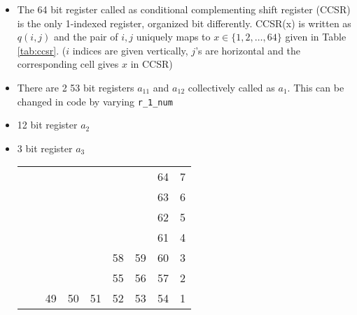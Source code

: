 \documentclass[a4paper,10pt]{article}
\begin{document}
\begin{itemize}
    \item The 64 bit register called as conditional complementing shift register (CCSR) is the only 1-indexed register, organized bit differently. CCSR(x) is written as $q{(i,j)}$ and the pair of $i,j$ uniquely maps to $x \in \{1,2,\ldots,64\}$ given in Table \ref{tab:ccsr}. ($i$ indices are given vertically, $j$'s are horizontal and the corresponding cell gives $x$ in CCSR)
    \item There are 2 53 bit registers $a_{11}$ and $a_{12}$ collectively called as $a_{1}$. This can be changed in code by varying \verb!r_1_num!
    \item 12 bit register $a_{2}$
    \item 3 bit register $a_{3}$
\begin{table}[h!]
\centering
\begin{tabular}{lllllllll}
\cline{8-8}
                               &                         &                         &                         &                         &                         & \multicolumn{1}{l|}{}   & \multicolumn{1}{l|}{64} & 7 \\ \cline{8-8}
                               &                         &                         &                         &                         &                         & \multicolumn{1}{l|}{}   & \multicolumn{1}{l|}{63} & 6 \\ \cline{8-8}
                               &                         &                         &                         &                         &                         & \multicolumn{1}{l|}{}   & \multicolumn{1}{l|}{62} & 5 \\ \cline{8-8}
                               &                         &                         &                         &                         &                         & \multicolumn{1}{l|}{}   & \multicolumn{1}{l|}{61} & 4 \\ \cline{6-8}
                               &                         &                         &                         & \multicolumn{1}{l|}{}   & \multicolumn{1}{l|}{58} & \multicolumn{1}{l|}{59} & \multicolumn{1}{l|}{60} & 3 \\ \cline{6-8}
                               &                         &                         &                         & \multicolumn{1}{l|}{}   & \multicolumn{1}{c|}{55} & \multicolumn{1}{l|}{56} & \multicolumn{1}{l|}{57} & 2 \\ \cline{3-8}
                               & \multicolumn{1}{l|}{}   & \multicolumn{1}{l|}{49} & \multicolumn{1}{l|}{50} & \multicolumn{1}{l|}{51} & \multicolumn{1}{l|}{52} & \multicolumn{1}{l|}{53} & \multicolumn{1}{l|}{54} & 1 \\ \cline{1-8}

\end{tabular}
\end{table}
\end{itemize}
\end{document}
